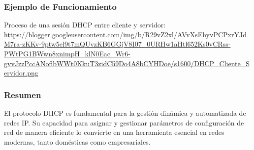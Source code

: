 \documentclass[a4paper,12pt]{article}
\begin{document}
\subsubsection*{Ejemplo de Funcionamiento}

Proceso de una sesión DHCP entre cliente y servidor: \url{https://blogger.googleusercontent.com/img/b/R29vZ2xl/AVvXsEhyvPCPxrYJdM7ra-zKKv-9ptw5el9t7mQUvzKB6GGjV8I07_0URHw1aHtl652Ks0vCRss-PWtPG1BWwn8xnimpH_klN0Eac_Wr6-gvvJzzPccANoflbWWt0KkuT3zidC59Do4A8bCYHDoe/s1600/DHCP_Cliente_Servidor.png}

\subsubsection*{Resumen}

El protocolo DHCP es fundamental para la gestión dinámica y automatizada de redes IP. Su capacidad para asignar y gestionar parámetros de configuración de red de manera eficiente lo convierte en una herramienta esencial en redes modernas, tanto domésticas como empresariales.















    
\end{document}
